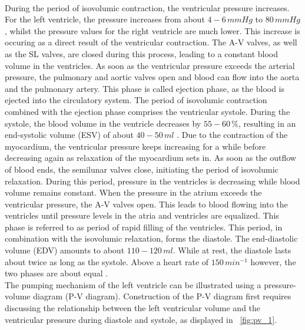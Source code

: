 \\During the period of isovolumic contraction, the ventricular pressure increases. For the left ventricle, the pressure increases from about $4-6 \, mmHg$ to $80 \, mmHg$, whilst the pressure values for the right ventricle are much lower. This increase is occuring as a direct result of the ventricular contraction. The A-V valves, as well as the SL valves, are closed during this process, leading to a constant blood volume in the ventricles. As soon as the ventricular pressure exceeds the arterial pressure, the pulmonary and aortic valves open and blood can flow into the aorta and the pulmonary artery. This phase is called ejection phase, as the blood is ejected into the circulatory system. The period of isovolumic contraction combined with the ejection phase comprises the ventricular systole. \cite{HKS4} During the systole, the blood volume in the ventricle decreases by $55-60 \, \%$, resulting in an end-systolic volume (ESV) of about $40-50 \, ml$ \cite{GH20}. Due to the contraction of the myocardium, the ventricular pressure keeps increasing for a while before decreasing again as relaxation of the myocardium sets in. As soon as the outflow of blood ends, the semilunar valves close, initiating the period of isovolumic relaxation. During this period, pressure in the ventricles is decreasing while blood volume remains constant. When the pressure in the atrium exceeds the ventricular pressure, the A-V valves open. This leads to blood flowing into the ventricles until pressure levels in the atria and ventricles are equalized. \cite{HKS4} This phase is referred to as period of rapid filling of the ventricles. This period, in combination with the isovolumic relaxation, forms the diastole. The end-diastolic volume (EDV) amounts to about $110-120 \, ml$. \cite{GH20} While at rest, the diastole lasts about twice as long as the systole. Above a heart rate of $150 \, min^{-1}$ however, the two phases are about equal \cite{HKS4}.
\\The pumping mechanism of the left ventricle can be illustrated using a pressure-volume diagram (P-V diagram). Construction of the P-V diagram first requires discussing the relationship between the left ventricular volume and the ventricular pressure during diastole and systole, as displayed in \figurename~\ref{fig:pv_1}.
